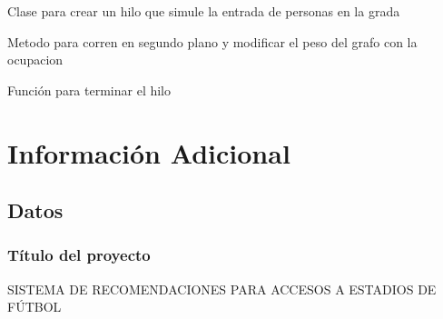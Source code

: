 \documentclass[letterpaper,10pt,spanish]{sphinxmanual}
\begin{document}
\begin{fulllineitems}
\label{\detokenize{Clases:Clases.ThreadingOcupacion}}
\sphinxAtStartPar
Clase para crear un hilo que simule la entrada de personas en la grada

\begin{fulllineitems}
\label{\detokenize{Clases:Clases.ThreadingOcupacion.run}}
\sphinxAtStartPar
Metodo para corren en segundo plano y modificar el peso del grafo con la ocupacion

\end{fulllineitems}


\begin{fulllineitems}
\label{\detokenize{Clases:Clases.ThreadingOcupacion.terminate}}
\sphinxAtStartPar
Función para terminar el hilo

\end{fulllineitems}


\end{fulllineitems}



\chapter{Información Adicional}
\label{\detokenize{Informacion_Adicional:informacion-adicional}}\label{\detokenize{Informacion_Adicional::doc}}

\section{Datos}
\label{\detokenize{Informacion_Adicional:datos}}

\subsection{Título del proyecto}
\label{\detokenize{Informacion_Adicional:titulo-del-proyecto}}
\sphinxAtStartPar
SISTEMA DE RECOMENDACIONES PARA ACCESOS A ESTADIOS DE FÚTBOL
\end{document}
